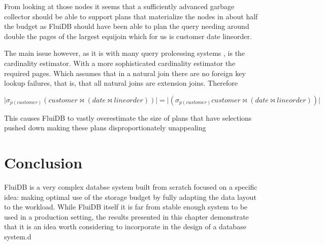 From looking at those nodes it seems that a sufficiently advanced
garbage collector should be able to support plans that materialize the
nodes in about half the budget as FluiDB should have been able to plan
the query needing around double the pages of the largest equijoin
which for us is customer date lineorder.

The main issue however, as it is with many query prolcessing systems
\cite{leisHowGoodAre2015}, is the cardinality estimator. With a more
sophisticated cardinality estimator the required pages. Which assumes
that in a natural join there are no foreign key lookup failures, that
is, that all natural joins are extension joins. Therefore

\[
\lvert \sigma _{p(customer)} (customer \Join (date \Join lineorder)) \rvert = \lvert (\sigma _{p(customer)} customer \Join (date \Join lineorder)) \rvert
\]


This causes FluiDB to vastly overestimate the size of plans that have
selections pushed down making these plans disproportionately
unappealing


\section{Conclusion}

FluiDB is a very complex databse system built from scratch focused on
a specific idea: making optimal use of the storage budget by fully
adapting the data layout to the workload. While FluiDB itself it is
far from stable enough system to be used in a production setting, the
results presented in this chapter demonstrate that it is an idea worth
considering to incorporate in the design of a database system.d

